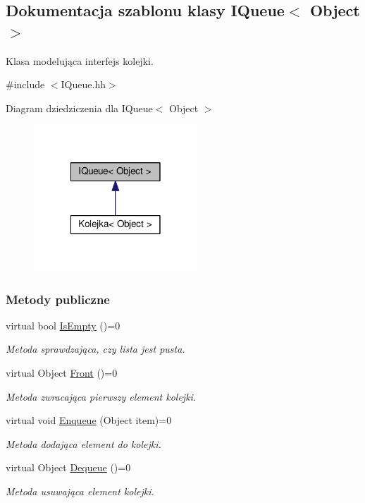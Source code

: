 \hypertarget{class_i_queue}{\subsection{Dokumentacja szablonu klasy I\-Queue$<$ Object $>$}
\label{class_i_queue}
}


Klasa modelująca interfejs kolejki.  




{\ttfamily \#include $<$I\-Queue.\-hh$>$}



Diagram dziedziczenia dla I\-Queue$<$ Object $>$
\nopagebreak
\begin{figure}[H]
\begin{center}
\leavevmode
\includegraphics[width=174pt]{class_i_queue__inherit__graph}
\end{center}
\end{figure}
\subsubsection*{Metody publiczne}
\begin{DoxyCompactItemize}
\item 
virtual bool \hyperlink{class_i_queue_ae1c9e42be6ff647666c4468d3eec55a1}{Is\-Empty} ()=0
\begin{DoxyCompactList}\small\item\em Metoda sprawdzająca, czy lista jest pusta. \end{DoxyCompactList}\item 
virtual Object \hyperlink{class_i_queue_ab07e072ad92e4e93d57a0d3950c72764}{Front} ()=0
\begin{DoxyCompactList}\small\item\em Metoda zwracająca pierwszy element kolejki. \end{DoxyCompactList}\item 
virtual void \hyperlink{class_i_queue_af818d0fb70a5d088e6088c42f51df7e1}{Enqueue} (Object item)=0
\begin{DoxyCompactList}\small\item\em Metoda dodająca element do kolejki. \end{DoxyCompactList}\item 
virtual Object \hyperlink{class_i_queue_a6836f64bdf7102fdda590f21f7e5e208}{Dequeue} ()=0
\begin{DoxyCompactList}\small\item\em Metoda usuwająca element kolejki. \end{DoxyCompactList}\end{DoxyCompactItemize}


